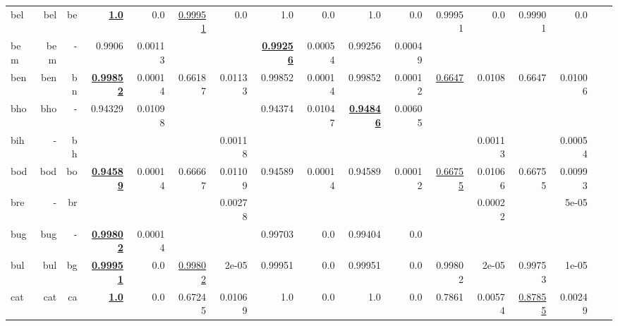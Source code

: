 \documentclass[11pt]{article}
\begin{document}
\begin{table*}[h]
{\begin{tabular}{lrrrrrrrrrrrrrrrr}
bel         & bel         & be         & \textbf{\underline{1.0}}         & 0.0         & \underline{0.99951}         & 0.0         & 1.0         & 0.0         & 1.0         & 0.0         & 0.99951         & 0.0         & 0.99901         & 0.0         \\
bem         & bem         & -         & 0.9906         & 0.00113         &          &          & \textbf{\underline{0.99256}}         & 0.00054         & 0.99256         & 0.00049         &          &          &          &          \\
ben         & ben         & bn         & \textbf{\underline{0.99852}}         & 0.00014         & 0.66187         & 0.01133         & 0.99852         & 0.00014         & 0.99852         & 0.00012         & \underline{0.6647}         & 0.0108         & 0.6647         & 0.01006         \\
bho         & bho         & -         & 0.94329         & 0.01098         &          &          & 0.94374         & 0.01047         & \textbf{\underline{0.94846}}         & 0.00605         &          &          &          &          \\
bih         & -         & bh         &          &          &          & 0.00118         &          &          &          &          &          & 0.00113         &          & 0.00054         \\
bod         & bod         & bo         & \textbf{\underline{0.94589}}         & 0.00014         & 0.66667         & 0.01109         & 0.94589         & 0.00014         & 0.94589         & 0.00012         & \underline{0.66755}         & 0.01066         & 0.66755         & 0.00993         \\
bre         & -         & br         &          &          &          & 0.00278         &          &          &          &          &          & 0.00022         &          & 5e-05         \\
bug         & bug         & -         & \textbf{\underline{0.99802}}         & 0.00014         &          &          & 0.99703         & 0.0         & 0.99404         & 0.0         &          &          &          &          \\
bul         & bul         & bg         & \textbf{\underline{0.99951}}         & 0.0         & \underline{0.99802}         & 2e-05         & 0.99951         & 0.0         & 0.99951         & 0.0         & 0.99802         & 2e-05         & 0.99753         & 1e-05         \\
cat         & cat         & ca         & \textbf{\underline{1.0}}         & 0.0         & 0.67245         & 0.01069         & 1.0         & 0.0         & 1.0         & 0.0         & 0.7861         & 0.00574         & \underline{0.87855}         & 0.00249         \\

\end{tabular}}
\end{table*}
\end{document}
